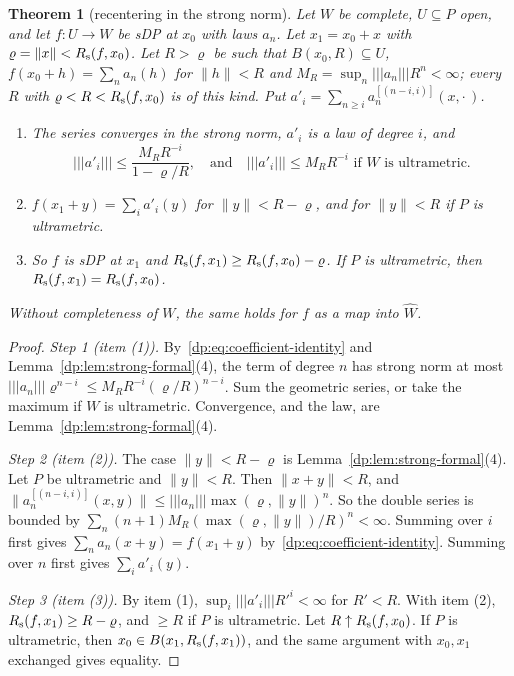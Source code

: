 \documentclass[11pt]{amsart}
\newtheorem{theorem}{Theorem}[section]
\theoremstyle{definition}
\theoremstyle{remark}
\numberwithin{equation}{section}
\newcommand{\norm}[1]{\lVert #1\rVert}
\theoremstyle{plain}
\theoremstyle{definition}
\theoremstyle{plain}
\begin{document}
\begin{theorem}[recentering in the strong norm]\label{dp:thm:strong-recenter}
Let $W$ be complete, $U\subseteq P$ open, and let $f\colon U\to W$ be sDP at $x_0$ with laws $a_n$. Let $x_1=x_0+x$ with $\varrho=\norm x<R_{\rm s}(f,x_0)$. Let $R>\varrho$ be such that $B(x_0,R)\subseteq U$, $f(x_0+h)=\sum_na_n(h)$ for $\norm h<R$ and $M_R=\sup_n\lvert\!\lvert\!\lvert a_n\rvert\!\rvert\!\rvert R^n<\infty$; every $R$ with $\varrho<R<R_{\rm s}(f,x_0)$ is of this kind. Put $a'_i=\sum_{n\ge i}a_n^{[(n-i,i)]}(x,\cdot\,)$.
\begin{enumerate}
\item The series converges in the strong norm, $a'_i$ is a law of degree $i$, and
\[
 \lvert\!\lvert\!\lvert a'_i\rvert\!\rvert\!\rvert\le\frac{M_RR^{-i}}{1-\varrho/R},\quad\text{and}\quad\lvert\!\lvert\!\lvert a'_i\rvert\!\rvert\!\rvert\le M_RR^{-i}\text{ if $W$ is ultrametric.}
\]
\item $f(x_1+y)=\sum_ia'_i(y)$ for $\norm y<R-\varrho$, and for $\norm y<R$ if $P$ is ultrametric.
\item So $f$ is sDP at $x_1$ and $R_{\rm s}(f,x_1)\ge R_{\rm s}(f,x_0)-\varrho$. If $P$ is ultrametric, then $R_{\rm s}(f,x_1)=R_{\rm s}(f,x_0)$.
\end{enumerate}
Without completeness of $W$, the same holds for $f$ as a map into $\widehat W$.
\end{theorem}

\begin{proof}
\emph{Step 1 (item (1)).} By~\eqref{dp:eq:coefficient-identity} and Lemma~\ref{dp:lem:strong-formal}(4), the term of degree $n$ has strong norm at most $\lvert\!\lvert\!\lvert a_n\rvert\!\rvert\!\rvert\varrho^{n-i}\le M_RR^{-i}(\varrho/R)^{n-i}$. Sum the geometric series, or take the maximum if $W$ is ultrametric. Convergence, and the law, are Lemma~\ref{dp:lem:strong-formal}(4).

\emph{Step 2 (item (2)).} The case $\norm y<R-\varrho$ is Lemma~\ref{dp:lem:strong-formal}(4). Let $P$ be ultrametric and $\norm y<R$. Then $\norm{x+y}<R$, and $\norm{a_n^{[(n-i,i)]}(x,y)}\le\lvert\!\lvert\!\lvert a_n\rvert\!\rvert\!\rvert\max(\varrho,\norm y)^n$. So the double series is bounded by $\sum_n(n+1)M_R(\max(\varrho,\norm y)/R)^n<\infty$. Summing over $i$ first gives $\sum_na_n(x+y)=f(x_1+y)$ by~\eqref{dp:eq:coefficient-identity}. Summing over $n$ first gives $\sum_ia'_i(y)$.

\emph{Step 3 (item (3)).} By item (1), $\sup_i\lvert\!\lvert\!\lvert a'_i\rvert\!\rvert\!\rvert R'^i<\infty$ for $R'<R$. With item (2), $R_{\rm s}(f,x_1)\ge R-\varrho$, and $\ge R$ if $P$ is ultrametric. Let $R\uparrow R_{\rm s}(f,x_0)$. If $P$ is ultrametric, then $x_0\in B(x_1,R_{\rm s}(f,x_1))$, and the same argument with $x_0,x_1$ exchanged gives equality.
\end{proof}
\end{document}
